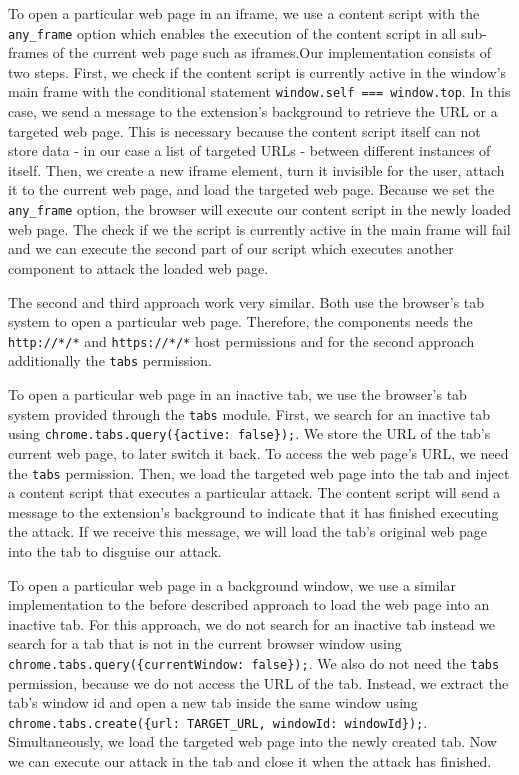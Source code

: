 	To open a particular web page in an iframe, we use a content script with the \texttt{any\_frame} option which enables the execution of the content script in all sub-frames of the current web page such as iframes.Our implementation consists of two steps. First, we check if the content script is currently active in the window's main frame with the conditional statement \lstinline|window.self === window.top|. In this case, we send a message to the extension's background to retrieve the URL or a targeted web page. This is necessary because the content script itself can not store data - in our case a list of targeted URLs - between different instances of itself. Then, we create a new iframe element, turn it invisible for the user, attach it to the current web page, and load the targeted web page. Because we set the \texttt{any\_frame} option, the browser will execute our content script in the newly loaded web page. The check if we the script is currently active in the main frame will fail and we can execute the second part of our script which executes another component to attack the loaded web page.
	
	The second and third approach work very similar. Both use the browser's tab system to open a particular web page. Therefore, the components needs the \texttt{http://*/*} and \texttt{https://*/*} host permissions and for the second approach additionally the \texttt{tabs} permission.
	
	To open a particular web page in an inactive tab, we use the browser's tab system provided through the \texttt{tabs} module. First, we search for an inactive tab using \lstinline|chrome.tabs.query({active: false});|. We store the URL of the tab's current web page, to later switch it back. To access the web page's URL, we need the \texttt{tabs} permission. Then, we load the targeted web page into the tab and inject a content script that executes a particular attack. The content script will send a message to the extension's background to indicate that it has finished executing the attack. If we receive this message, we will load the tab's original web page into the tab to disguise our attack.
	
	To open a particular web page in a background window, we use a similar implementation to the before described approach to load the web page into an inactive tab. For this approach, we do not search for an inactive tab instead we search for a tab that is not in the current browser window using \lstinline|chrome.tabs.query({currentWindow: false});|. We also do not need the \texttt{tabs} permission, because we do not access the URL of the tab. Instead, we extract the tab's window id and open a new tab inside the same window using \lstinline|chrome.tabs.create({url: TARGET_URL, windowId: windowId});|. Simultaneously, we load the targeted web page into the newly created tab. Now we can execute our attack in the tab and close it when the attack has finished.
	

